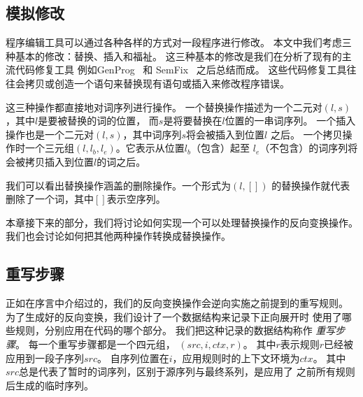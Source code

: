 
\subsection{模拟修改}\label{sec:changes}
程序编辑工具可以通过各种各样的方式对一段程序进行修改。
本文中我们考虑三种基本的修改：替换、插入和福祉。
这三种基本的修改是我们在分析了现有的主流代码修复工具
例如GenProg~\cite{le2012genprog} 和 SemFix~\cite{nguyen2013semfix}
之后总结而成。
这些代码修复工具往往会拷贝或创造一个语句来替换现有语句或插入来修改程序错误。

这三种操作都直接地对词序列进行操作。
一个替换操作描述为一个二元对$(l, s)$，其中$l$是要被替换的词的位置，
而$s$是将要替换在$l$位置的一串词序列。
一个插入操作也是一个二元对$(l, s)$，其中词序列$s$将会被插入到位置$l$
之后。
一个拷贝操作时一个三元组$(l, l_b, l_e)$。它表示从位置$l_b$（包含）起至
$l_e$（不包含）的词序列将会被拷贝插入到位置$l$的词之后。

我们可以看出替换操作涵盖的删除操作。一个形式为$(l, [])$
的替换操作就代表删除了一个词，其中$[]$表示空序列。

本章接下来的部分，我们将讨论如何实现一个可以处理替换操作的反向变换操作。
我们也会讨论如何把其他两种操作转换成替换操作。

\subsection{重写步骤}\label{sec:steps}
正如在序言中介绍过的，我们的反向变换操作会逆向实施之前提到的重写规则。
为了生成好的反向变换，我们设计了一个数据结构来记录下正向展开时
使用了哪些规则，分别应用在代码的哪个部分。
我们把这种记录的数据结构称作 \emph{重写步骤}。
每一个重写步骤都是一个四元组， $(src, i, ctx, r)$。
其中$r$表示规则$r$已经被应用到一段子序列$src$。
自序列位置在$i$，应用规则时的上下文环境为$ctx$。
其中$src$总是代表了暂时的词序列，区别于源序列与最终系列，是应用了
之前所有规则后生成的临时序列。

